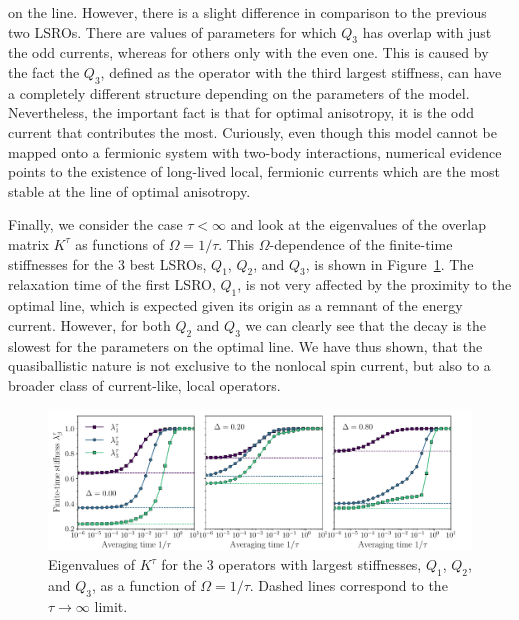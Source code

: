 on the line. However, there is a slight difference in comparison to the previous two LSROs. There are
values of parameters for which \(Q_3\) has overlap with just the odd currents, whereas for others
only with the even one. This is caused by the fact the \(Q_3\), defined as the operator with
the third largest stiffness, can have a completely different structure depending on the parameters of
the model. Nevertheless, the important fact is that for optimal anisotropy, it is the odd
current that contributes the most. Curiously, even though this model cannot be mapped
onto a fermionic system with two-body interactions, numerical evidence points to the existence of long-lived
local, fermionic currents which are the most stable at the line of optimal anisotropy.

Finally, we consider the case \(\tau < \infty\) and look at the eigenvalues
of the overlap matrix \(K^{\tau}\) as functions of \(\Omega = 1/\tau\). This
\(\Omega\)-dependence of the finite-time stiffnesses for the 3 best LSROs,
\(Q_1\), \(Q_2\), and \(Q_3\), is shown in Figure~\ref{fig:lsro_eigenvalues}.
The relaxation time of the first LSRO, \(Q_1\), is not very affected by the proximity to the optimal line,
which is expected given its origin as a remnant of the energy current. However, for both
\(Q_2\) and \(Q_3\) we can clearly see that the decay is the slowest for the parameters on the optimal line.
We have thus shown, that the quasiballistic nature is not exclusive to the nonlocal spin current,
but also to a broader class of current-like, local operators.
\begin{figure}[h]
  \centering
  \includegraphics[width=\linewidth]{Figures/finite_time_stiffness.pdf}
  \caption{Eigenvalues of \(K^{\tau}\) for the 3 operators with largest stiffnesses, \(Q_1\), \(Q_2\), and \(Q_3\),
    as a function of \(\Omega = 1/\tau\). Dashed lines correspond to the \(\tau\to\infty\) limit.}
  \label{fig:lsro_eigenvalues}
\end{figure}